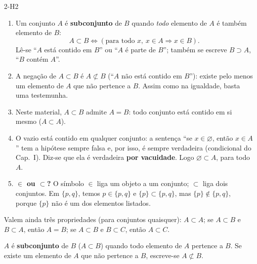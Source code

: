 \begin{construcao}[subconjunto]{2-H2}
\begin{enumerate}[label=(\arabic*)]
  \item Um conjunto $A$ é \textbf{subconjunto} de $B$ quando \emph{todo} elemento de $A$ é também elemento de $B$:
\[
A\subset B\iff (\text{para todo }x,\ x\in A\Rightarrow x\in B).
\]
Lê-se \enquote{$A$ está contido em $B$} ou \enquote{$A$ é parte de $B$}; também se escreve $B\supset A$, \enquote{$B$ contém $A$}.
\begin{center}
\end{center}
  \item A negação de $A\subset B$ é $A\not\subset B$ (\enquote{$A$ não está contido em $B$}): existe pelo menos um elemento de $A$ que não pertence a $B$. Assim como na igualdade, basta uma testemunha.
  \item Neste material, $A\subset B$ admite $A=B$: todo conjunto está contido em si mesmo ($A\subset A$).
  \item O vazio está contido em qualquer conjunto: a sentença \enquote{se $x\in\varnothing$, então $x\in A$} tem a hipótese sempre falsa e, por isso, é sempre verdadeira (condicional do Cap.~I). Diz-se que ela é verdadeira \textbf{por vacuidade}. Logo $\varnothing\subset A$, para todo $A$.
  \item \textbf{$\in$ ou $\subset$?} O símbolo $\in$ liga um objeto a um conjunto; $\subset$ liga dois conjuntos. Em $\{p,q\}$, temos $p\in\{p,q\}$ e $\{p\}\subset\{p,q\}$, mas $\{p\}\notin\{p,q\}$, porque $\{p\}$ não é um dos elementos listados.
\end{enumerate}
Valem ainda três propriedades (para conjuntos quaisquer): $A\subset A$; se $A\subset B$ e $B\subset A$, então $A=B$; se $A\subset B$ e $B\subset C$, então $A\subset C$.
\end{construcao}

\begin{definicao}[subconjunto]
$A$ é \textbf{subconjunto} de $B$ ($A\subset B$) quando todo elemento de $A$ pertence a $B$. Se existe um elemento de $A$ que não pertence a $B$, escreve-se $A\not\subset B$.
\end{definicao}

